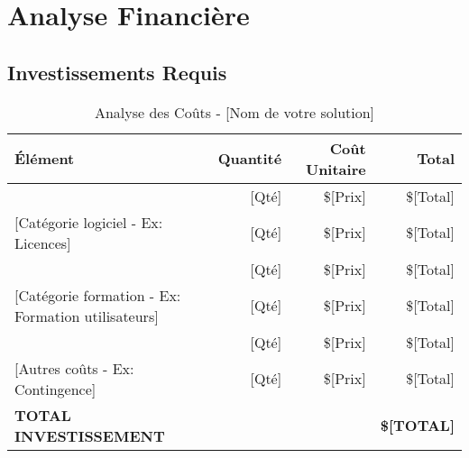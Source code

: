 
\section{Analyse Financière}

\subsection{Investissements Requis}

\begin{table}[H]
\centering
\caption{Analyse des Coûts - [Nom de votre solution]}
\label{tab:cost-analysis}
\begin{tabular}{|p{}|r|r|r|}
\hline
\rowcolor{DollaramaGreen!30}
\textbf{\color{white}Élément} & 
\textbf{\color{white}Quantité} & 
\textbf{\color{white}Coût Unitaire} & 
\textbf{\color{white}Total} \\
\hline
[Catégorie matériel - Ex: Serveurs] & [Qté] & \$[Prix] & \$[Total] \\
\hline
\rowcolor{gray!10}
[Catégorie logiciel - Ex: Licences] & [Qté] & \$[Prix] & \$[Total] \\
\hline
[Catégorie services - Ex: Installation] & [Qté] & \$[Prix] & \$[Total] \\
\hline
\rowcolor{gray!10}
[Catégorie formation - Ex: Formation utilisateurs] & [Qté] & \$[Prix] & \$[Total] \\
\hline
[Catégorie support - Ex: Maintenance annuelle] & [Qté] & \$[Prix] & \$[Total] \\
\hline
\rowcolor{gray!10}
[Autres coûts - Ex: Contingence] & [Qté] & \$[Prix] & \$[Total] \\
\hline
\rowcolor{DollaramaGreen!20}
\textbf{TOTAL INVESTISSEMENT} & & & \textbf{\$[TOTAL]} \\
\hline
\end{tabular}
\end{table}

